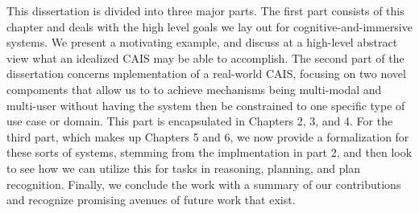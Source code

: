 This dissertation is divided into three major parts. The first part
consists of this chapter and deals with the high level goals we lay
out for cognitive-and-immersive systems. We present a motivating
example, and discuss at a high-level abstract view what an idealized
CAIS may be able to accomplish. The second part of the dissertation
concerns mplementation of a real-world CAIS, focusing on two novel
compoments that allow us to to achieve mechanisms being multi-modal
and multi-user without having the system then be constrained to one
specific type of use case or domain. This part is encapsulated in
Chapters 2, 3, and 4. For the third part, which makes up Chapters 5
and 6, we now provide a formalization for these sorts of systems,
stemming from the implmentation in part 2, and then look to see how we
can utilize this for tasks in reasoning, planning, and plan
recognition. Finally, we conclude the work with a summary of our
contributions and recognize promising avenues of future work that
exist.
